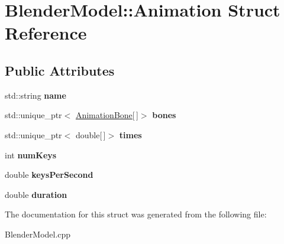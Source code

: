 \hypertarget{structBlenderModel_1_1Animation}{\section{\-Blender\-Model\-:\-:\-Animation \-Struct \-Reference}
\label{structBlenderModel_1_1Animation}
}
\subsection*{\-Public \-Attributes}
\begin{DoxyCompactItemize}
\item 
\hypertarget{structBlenderModel_1_1Animation_a438c0737beda1ee6ad8254352a6bcae0}{std\-::string {\bfseries name}}\label{structBlenderModel_1_1Animation_a438c0737beda1ee6ad8254352a6bcae0}

\item 
\hypertarget{structBlenderModel_1_1Animation_a73cdeb48bcc01860a236310bd6d4a670}{std\-::unique\-\_\-ptr$<$ \hyperlink{structAnimationBone}{\-Animation\-Bone}\mbox{[}$\,$\mbox{]}$>$ {\bfseries bones}}\label{structBlenderModel_1_1Animation_a73cdeb48bcc01860a236310bd6d4a670}

\item 
\hypertarget{structBlenderModel_1_1Animation_a8bf004aa13256efce3305a819ce58aa5}{std\-::unique\-\_\-ptr$<$ double\mbox{[}$\,$\mbox{]}$>$ {\bfseries times}}\label{structBlenderModel_1_1Animation_a8bf004aa13256efce3305a819ce58aa5}

\item 
\hypertarget{structBlenderModel_1_1Animation_a641051e7db12e7fb9638b2b29c866fc9}{int {\bfseries num\-Keys}}\label{structBlenderModel_1_1Animation_a641051e7db12e7fb9638b2b29c866fc9}

\item 
\hypertarget{structBlenderModel_1_1Animation_a077c66aa636ca8d3771f6d5b25614c93}{double {\bfseries keys\-Per\-Second}}\label{structBlenderModel_1_1Animation_a077c66aa636ca8d3771f6d5b25614c93}

\item 
\hypertarget{structBlenderModel_1_1Animation_a2ec056e0c909418372ae95e32c1c2efc}{double {\bfseries duration}}\label{structBlenderModel_1_1Animation_a2ec056e0c909418372ae95e32c1c2efc}

\end{DoxyCompactItemize}


\-The documentation for this struct was generated from the following file\-:\begin{DoxyCompactItemize}
\item 
\-Blender\-Model.\-cpp\end{DoxyCompactItemize}
